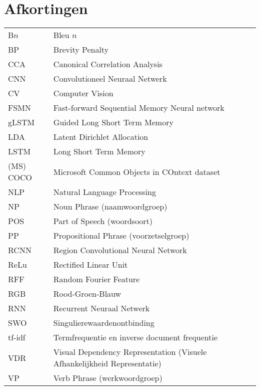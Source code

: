 \documentclass[master=cws,masteroption=ai]{kulemt}
\begin{document}
\section*{Afkortingen}
\begin{flushleft}
  \renewcommand{\arraystretch}{1.1}
  \begin{tabularx}{\textwidth}{@{}p{25mm}X@{}}
  	B$n$ & Bleu $n$\\
  	BP & Brevity Penalty\\
  	CCA & Canonical Correlation Analysis \\
  	CNN & Convolutioneel Neuraal Netwerk \\
  	CV & Computer Vision \\
  	FSMN & Fast-forward Sequential Memory Neural network\\
  	gLSTM & Guided Long Short Term Memory \\
    LDA  & Latent Dirichlet Allocation \\
    LSTM & Long Short Term Memory \\
    (MS) COCO & Microsoft Common Objects in COntext dataset\\
    NLP & Natural Language Processing\\
    NP & Noun Phrase (naamwoordgroep)\\
    POS & Part of Speech (woordsoort)\\
    PP & Propositional Phrase (voorzetselgroep)\\
    RCNN & Region Convolutional Neural Network \\
    ReLu & Rectified Linear Unit\\
    RFF & Random Fourier Feature \\
    RGB & Rood-Groen-Blauw\\
    RNN & Recurrent Neuraal Netwerk \\
    SWO & Singulierewaardenontbinding \\
    tf-idf & Termfrequentie en inverse document frequentie \\
	VDR & Visual Dependency Representation (Visuele Afhankelijkheid Representatie)\\
	VP & Verb Phrase (werkwoordgroep)\\

  \end{tabularx}
\end{flushleft}
\end{document}
